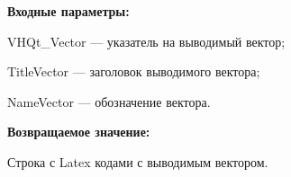 \textbf{Входные параметры:}
 
VHQt\_Vector --- указатель на выводимый вектор;
 
TitleVector --- заголовок выводимого вектора;
 
NameVector --- обозначение вектора.
	
\textbf{Возвращаемое значение:}

Строка с Latex кодами с выводимым вектором.
